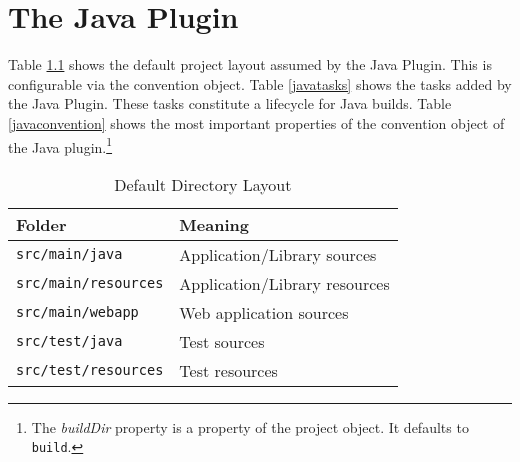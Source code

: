 \chapter{The Java Plugin} %
\label{cha:the_java_plugin}
Table \ref{javalayout} shows the default project layout assumed by the Java Plugin. This is configurable via the convention object. Table \ref{javatasks} shows the tasks added by the Java Plugin. These tasks constitute a lifecycle for Java builds. Table \ref{javaconvention} shows the most important properties of the convention object of the Java plugin.\footnote{The \emph{buildDir} property is a property of the project object. It defaults to \texttt{build}.}

\begin{table}[h]
	\begin{center}
	\begin{tabular}{|l|l|} \hline
	\textbf{Folder} & \textbf{Meaning} \\ \hline
	\texttt{src/main/java} & Application/Library sources \\ \hline
	\texttt{src/main/resources} & Application/Library resources \\ \hline
	\texttt{src/main/webapp} & Web application sources \\ \hline
	\texttt{src/test/java} & Test sources \\ \hline
	\texttt{src/test/resources} & Test resources \\ \hline
	\end{tabular}
	\end{center}
	\caption{Default Directory Layout}	
	\label{javalayout}
\end{table}


